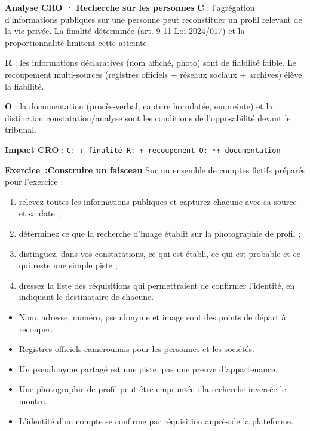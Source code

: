 \begin{boxCRO}
\textbf{Analyse CRO · Recherche sur les personnes}
\textbf{C} : l'agrégation d'informations publiques sur une personne peut reconstituer un profil relevant de la vie privée. La finalité déterminée (art. 9-11 Loi 2024/017) et la proportionnalité limitent cette atteinte.

\textbf{R} : les informations déclaratives (nom affiché, photo) sont de fiabilité faible. Le recoupement multi-sources (registres officiels + réseaux sociaux + archives) élève la fiabilité.

\textbf{O} : la documentation (procès-verbal, capture horodatée, empreinte) et la distinction constatation/analyse sont les conditions de l'opposabilité devant le tribunal.

\textbf{Impact CRO} : \texttt{C: ↓ finalité \quad R: ↑ recoupement \quad O: ↑↑ documentation}
\end{boxCRO}

\begin{boxexo}
\textbf{Exercice~:Construire un faisceau}
Sur un ensemble de comptes fictifs préparés pour l'exercice :
\begin{enumerate}
\item relevez toutes les informations publiques et capturez chacune avec sa source et sa date ;
\item déterminez ce que la recherche d'image établit sur la photographie de profil ;
\item distinguez, dans vos constatations, ce qui est établi, ce qui est probable et ce qui reste une simple piste ;
\item dressez la liste des réquisitions qui permettraient de confirmer l'identité, en indiquant le destinataire de chacune.
\end{enumerate}
\end{boxexo}

\begin{boxresume}
\begin{itemize}
\item Nom, adresse, numéro, pseudonyme et image sont des points de départ à recouper.
\item Registres officiels camerounais pour les personnes et les sociétés.
\item Un pseudonyme partagé est une piste, pas une preuve d'appartenance.
\item Une photographie de profil peut être empruntée : la recherche inversée le montre.
\item L'identité d'un compte se confirme par réquisition auprès de la plateforme.
\end{itemize}
\end{boxresume}

